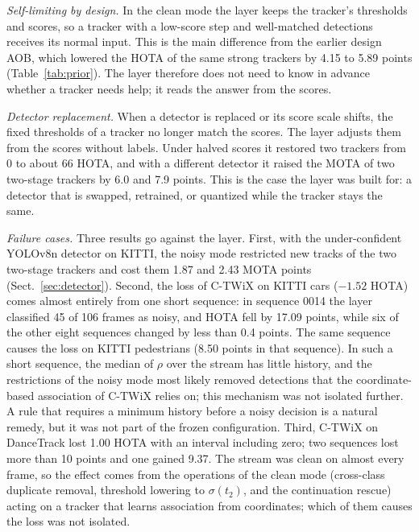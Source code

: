 \documentclass[pdflatex,sn-mathphys-num]{sn-jnl}
\newcommand{\aob}{AOB}
\begin{document}
\emph{Self-limiting by design.} In the clean mode the layer keeps the
tracker's thresholds and scores, so a tracker with a low-score step and
well-matched detections receives its normal input. This is the main
difference from the earlier design \aob{}, which lowered the HOTA of the same
strong trackers by 4.15 to 5.89 points (Table~\ref{tab:prior}). The layer
therefore does not need to know in advance whether a tracker needs help; it
reads the answer from the scores.

\emph{Detector replacement.} When a detector is replaced or its score scale
shifts, the fixed thresholds of a tracker no longer match the scores. The
layer adjusts them from the scores without labels. Under halved scores it
restored two trackers from 0 to about 66 HOTA, and with a different detector
it raised the MOTA of two two-stage trackers by 6.0 and 7.9 points. This is
the case the layer was built for: a detector that is swapped, retrained, or
quantized while the tracker stays the same.

\emph{Failure cases.} Three results go against the layer. First, with the
under-confident YOLOv8n detector on KITTI, the noisy mode restricted new
tracks of the two two-stage trackers and cost them 1.87 and 2.43 MOTA points
(Sect.~\ref{sec:detector}). Second, the loss of C-TWiX on KITTI cars
($-1.52$ HOTA) comes almost entirely from one short sequence: in sequence 0014
the layer classified 45 of 106 frames as noisy, and HOTA fell by 17.09 points,
while six of the other eight sequences changed by less than 0.4 points. The
same sequence causes the loss on KITTI pedestrians (8.50 points in that
sequence). In such a short sequence, the median of $\rho$ over the stream has
little history, and the restrictions of the noisy mode most likely removed
detections that the coordinate-based association of C-TWiX relies on; this
mechanism was not isolated further. A rule that requires a minimum history
before a noisy decision is a natural remedy, but it was not part of the frozen
configuration. Third, C-TWiX on DanceTrack lost 1.00 HOTA with an interval
including zero; two sequences lost more than 10 points and one gained 9.37.
The stream was clean on almost every frame, so the effect comes from the
operations of the clean mode (cross-class duplicate removal, threshold
lowering to $\sigma(t_2)$, and the continuation rescue) acting on a tracker
that learns association from coordinates; which of them causes the loss was
not isolated.
\end{document}
